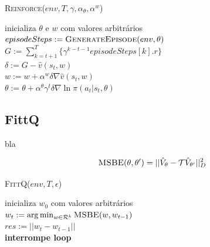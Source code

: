 \documentclass[letterpaper]{article}
\begin{document}
\linesnumbered
\dontprintsemicolon
\begin{algorithm}[t!]
{
	\caption{\textsc{Reinforce}($ env, T, \gamma, \alpha_{\theta}, \alpha^{w} $)}
	\label{alg:reinforce_baseline}
    inicializa $ \theta $ e $ w $ com valores arbitrários \\

    {
      $episodeSteps := \textsc{GenerateEpisode}(env, \theta)$\\

      {
        $G := \sum_{k = t+1}^T \{ \gamma^{k-t-1} episodeSteps[k].r \}$\\
        $ \delta := G - \hat{v}(s_t, w) $\\
        $ w := w + \alpha^w \delta \nabla \hat{v}(s_t, w) $\\
        $ \theta := \theta + \alpha^{\theta} \gamma^t \delta \nabla \ln \pi(a_t|s_t, \theta) $
      }
    }
}
\end{algorithm}


\subsection{FittQ}

bla

\begin{equation} \label{eq:msbe}
  \textsc{MSBE}(\theta, \theta') = || \hat{V}_{\theta} - \mathcal{T} \hat{V}_{\theta'} ||^2_D
\end{equation}

\linesnumbered
\dontprintsemicolon
\begin{algorithm}[t!]
{
	\caption{\textsc{FittQ}($ env, T, \epsilon $)}
	\label{alg:reinforce}
    inicializa $ w_0 $ com valores arbitrários \\

    {
      $w_t := \arg \min_{w \in \mathcal{R}^k} \textsc{MSBE}(w, w_{t-1}) $ \\
      $res := || w_t - w_{t-1} ||$ \\

      {
        \textbf{interrompe loop}
      }
    }
}
\end{algorithm}
\end{document}
